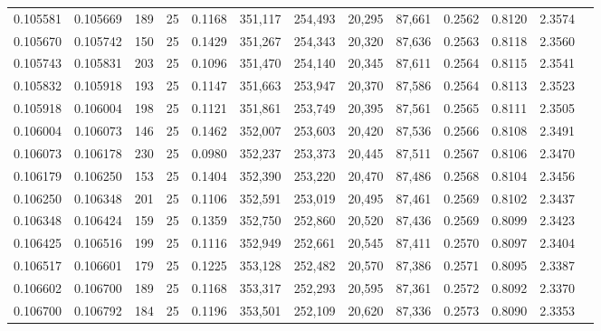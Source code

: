 \begin{tabular}{rrrrrrrrrrrrr}
0.105581 & 0.105669 &   189 &  25 &                                     0.1168 & 351,117 & 254,493 &  20,295 &  87,661 & 0.2562 & 0.8120 & 2.3574 \\
0.105670 & 0.105742 &   150 &  25 &                                     0.1429 & 351,267 & 254,343 &  20,320 &  87,636 & 0.2563 & 0.8118 & 2.3560 \\
0.105743 & 0.105831 &   203 &  25 &                                     0.1096 & 351,470 & 254,140 &  20,345 &  87,611 & 0.2564 & 0.8115 & 2.3541 \\
0.105832 & 0.105918 &   193 &  25 &                                     0.1147 & 351,663 & 253,947 &  20,370 &  87,586 & 0.2564 & 0.8113 & 2.3523 \\
0.105918 & 0.106004 &   198 &  25 &                                     0.1121 & 351,861 & 253,749 &  20,395 &  87,561 & 0.2565 & 0.8111 & 2.3505 \\
0.106004 & 0.106073 &   146 &  25 &                                     0.1462 & 352,007 & 253,603 &  20,420 &  87,536 & 0.2566 & 0.8108 & 2.3491 \\
0.106073 & 0.106178 &   230 &  25 &                                     0.0980 & 352,237 & 253,373 &  20,445 &  87,511 & 0.2567 & 0.8106 & 2.3470 \\
0.106179 & 0.106250 &   153 &  25 &                                     0.1404 & 352,390 & 253,220 &  20,470 &  87,486 & 0.2568 & 0.8104 & 2.3456 \\
0.106250 & 0.106348 &   201 &  25 &                                     0.1106 & 352,591 & 253,019 &  20,495 &  87,461 & 0.2569 & 0.8102 & 2.3437 \\
0.106348 & 0.106424 &   159 &  25 &                                     0.1359 & 352,750 & 252,860 &  20,520 &  87,436 & 0.2569 & 0.8099 & 2.3423 \\
0.106425 & 0.106516 &   199 &  25 &                                     0.1116 & 352,949 & 252,661 &  20,545 &  87,411 & 0.2570 & 0.8097 & 2.3404 \\
0.106517 & 0.106601 &   179 &  25 &                                     0.1225 & 353,128 & 252,482 &  20,570 &  87,386 & 0.2571 & 0.8095 & 2.3387 \\
0.106602 & 0.106700 &   189 &  25 &                                     0.1168 & 353,317 & 252,293 &  20,595 &  87,361 & 0.2572 & 0.8092 & 2.3370 \\
0.106700 & 0.106792 &   184 &  25 &                                     0.1196 & 353,501 & 252,109 &  20,620 &  87,336 & 0.2573 & 0.8090 & 2.3353 \\

\end{tabular}
